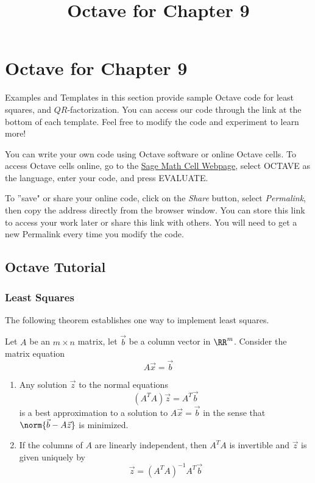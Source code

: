 \documentclass{ximera}
\title{Octave for Chapter 9} \license{CC BY-NC-SA 4.0}
\begin{document}
 
\begin{abstract}
\end{abstract}
\maketitle
 
\section*{Octave for Chapter 9}
 
Examples and Templates in this section provide sample Octave code for least squares, and $QR$-factorization. You can access our code through the link at the bottom of each template.  Feel free to modify the code and experiment to learn more! 
 
You can write your own code using Octave software or online Octave cells.  To access Octave cells online, go to the \href{https://sagecell.sagemath.org/}{Sage Math Cell Webpage}, select OCTAVE as the language, enter your code, and press EVALUATE. 
 
To ''save" or share your online code, click on the \emph{Share} button, select \emph{Permalink}, then copy the address directly from the browser window.  You can store this link to access your work later or share this link with others.  You will need to get a new Permalink every time you modify the code.
 
\subsection*{Octave Tutorial}
\subsubsection*{Least Squares}
The following theorem establishes one way to implement least squares.
 
\begin{theorem}[\ref{th:bestApprox}]
    Let $A$ be an $m\times n$ matrix, let $\vec{b}$ be a column vector in $\RR^m$.  Consider the matrix equation
    $$A\vec{x}=\vec{b}$$
    \begin{enumerate}
        \item Any solution $\vec{z}$ to the normal equations
        $$\left(A^TA\right)\vec{z}=A^T\vec{b}$$
        is a best approximation to a solution to $A\vec{x}=\vec{b}$ in the sense that $\norm{\vec{b}-A\vec{z}}$ is minimized.
        \item If the columns of $A$ are linearly independent, then $A^TA$ is invertible and $\vec{z}$ is given uniquely by
        $$\vec{z}=\left(A^TA\right)^{-1}A^T\vec{b}$$
    \end{enumerate}
    \end{theorem}
 
\end{document}
